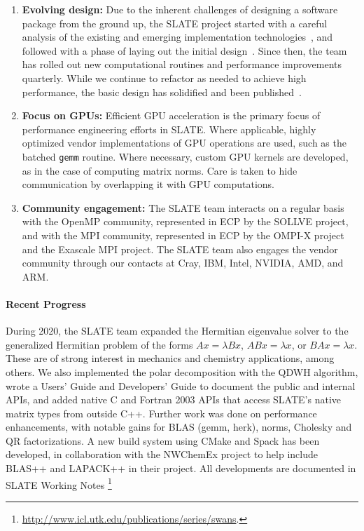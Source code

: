 \begin{enumerate}

\item
\textbf{Evolving design:}
Due to the inherent challenges of designing a software package
from the ground up, the SLATE project started
with a careful analysis of the existing and emerging
implementation technologies~\cite{abdelfattah2017roadmap},
and followed with a phase
of laying out the initial design~\cite{kurzak2017designing}.
Since then, the team has rolled out new computational routines
and performance improvements quarterly.
While we continue to refactor as needed to achieve high performance, the basic
design has solidified and been published~\cite{gates2019slate-design}.

\item
\textbf{Focus on GPUs:}
Efficient GPU acceleration is the primary focus of performance
engineering efforts in SLATE.
Where applicable, highly optimized vendor implementations of GPU operations
are used, such as the batched \texttt{gemm} routine.
Where necessary, custom GPU kernels are developed, as in the case of computing
matrix norms.
Care is taken to hide communication by overlapping it with GPU computations.

\item
\textbf{Community engagement:}
The SLATE team interacts on a regular basis with the OpenMP community,
represented in ECP by the SOLLVE project, and with the MPI community,
represented in ECP by the OMPI-X project and the Exascale MPI project.
The SLATE team also engages the vendor community through our contacts
at Cray, IBM, Intel, NVIDIA, AMD, and ARM.

\end{enumerate}

\paragraph{Recent Progress}

During 2020, the SLATE team expanded the Hermitian eigenvalue solver to
the generalized Hermitian problem of the forms $Ax = \lambda Bx$, $ABx =
\lambda x$, or $BAx = \lambda x$. These are of strong interest in
mechanics and chemistry applications, among others.
%
We also implemented the polar decomposition with the QDWH algorithm,
%
wrote a Users' Guide and Developers' Guide to document the public and
internal APIs,
%
and added native C and Fortran 2003 APIs that access SLATE's native
matrix types from outside C++.
%
Further work was done on performance enhancements, with notable gains
for BLAS (gemm, herk), norms, Cholesky and QR factorizations.
%
A new build system using CMake and Spack has been developed, in
collaboration with the NWChemEx project to help include BLAS++ and
LAPACK++ in their project.
%
All developments are documented in SLATE Working Notes
\footnote{\url{http://www.icl.utk.edu/publications/series/swans}.}

